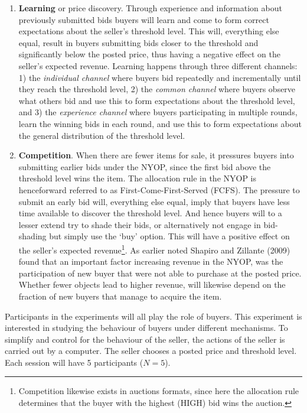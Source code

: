 \documentclass[a4paper,12pt]{article}
\begin{document}
	\begin{enumerate}
		\item {\bf Learning} or price discovery. Through experience and information about previously submitted bids buyers will learn and come to form correct expectations about the seller's threshold level. This will, everything else equal, result in buyers submitting bids closer to the threshold and significantly below the posted price, thus having a negative effect on the seller's expected revenue. Learning happens through three different channels: 1) the \emph{individual channel} where buyers bid repeatedly and incrementally until they reach the threshold level, 2) the \emph{common channel} where buyers observe what others bid and use this to form expectations about the threshold level, and 3) the \emph{experience channel} where buyers participating in multiple rounds, learn the winning bids in each round, and use this to form expectations about the general distribution of the threshold level.
	 	\item {\bf Competition}. When there are fewer items for sale, it pressures buyers into submitting earlier bids under the NYOP, since the first bid above the threshold level wins the item. The allocation rule in the NYOP is henceforward referred to as First-Come-First-Served (FCFS). The pressure to submit an early bid will, everything else equal, imply that buyers have less time available to discover the threshold level. And hence buyers will to a lesser extend try to shade their bids, or alternatively not engage in bid-shading but simply use the `buy' option. This will have a positive effect on the seller's expected revenue\footnote{Competition likewise exists in auctions formats, since here the allocation rule determines that the buyer with the highest (HIGH) bid wins the auction.}. As earlier noted Shapiro and Zillante (2009) found that an important factor increasing revenue in the NYOP, was the participation of new buyer that were not able to purchase at the posted price. Whether fewer objects lead to higher revenue, will likewise depend on the fraction of new buyers that manage to acquire the item.
	\end{enumerate}

	Participants in the experiments will all play the role of buyers. This experiment is interested in studying the behaviour of buyers under different mechanisms. To simplify and control for the behaviour of the seller, the actions of the seller is carried out by a computer. The seller chooses a posted price and threshold level. Each session will have 5 participants ($N=5$).
\end{document}

